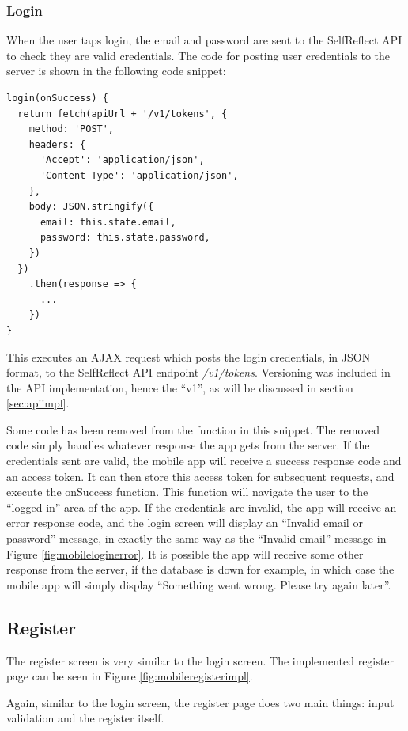 \documentclass[11pt,openright,a4paper]{report}
\begin{document}
\subsubsection{Login}
When the user taps login, the email and password are sent to the SelfReflect API to check they are valid credentials. The code for posting user credentials to the server is shown in the following code snippet:
\begin{lstlisting}
login(onSuccess) {
  return fetch(apiUrl + '/v1/tokens', {
    method: 'POST',
    headers: {
      'Accept': 'application/json',
      'Content-Type': 'application/json',
    },
    body: JSON.stringify({
      email: this.state.email,
      password: this.state.password,
    })
  })
    .then(response => {
      ...
    })
}
\end{lstlisting}

This executes an AJAX request which posts the login credentials, in JSON format, to the SelfReflect API endpoint \emph{/v1/tokens}. Versioning was included in the API implementation, hence the \enquote{v1}, as will be discussed in section \ref{sec:apiimpl}.

Some code has been removed from the function in this snippet. The removed code simply handles whatever response the app gets from the server. If the credentials sent are valid, the mobile app will receive a success response code and an access token. It can then store this access token for subsequent requests, and execute the onSuccess function. This function will navigate the user to the \enquote{logged in} area of the app. If the credentials are invalid, the app will receive an error response code, and the login screen will display an \enquote{Invalid email or password} message, in exactly the same way as the \enquote{Invalid email} message in Figure \ref{fig:mobileloginerror}. It is possible the app will receive some other response from the server, if the database is down for example, in which case the mobile app will simply display \enquote{Something went wrong. Please try again later}.

\subsection{Register}
The register screen is very similar to the login screen. The implemented register page can be seen in Figure \ref{fig:mobileregisterimpl}.

Again, similar to the login screen, the register page does two main things: input validation and the register itself.
\end{document}
